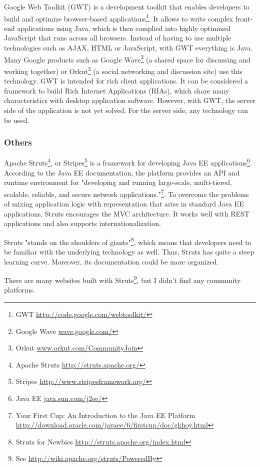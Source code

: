 Google Web Toolkit (GWT) is a development toolkit that enables developers to build and optimize browser-based applications\footnote{GWT \url{http://code.google.com/webtoolkit/}}.  It allows to write complex front-end applications using Java, which is then complied into highly optimized JavaScript that runs across all browsers. Instead of having to use multiple technologies such as AJAX, HTML or JavaScript, with GWT everything is Java. Many Google products such as Google Wave\footnote{Google Wave \url{wave.google.com/}} (a shared space for discussing and working together) or Orkut\footnote{Orkut \url{www.orkut.com/CommunityJoin}} (a social networking and discussion site) use this technology. GWT is intended for rich client applications. It can be considered a framework to build Rich Internet Applications (RIAs), which share many characteristics with desktop application software. 
However, with GWT, the server side of the application is not yet solved. For the server side, any technology can be used. 

\subsubsection{Others}
Apache Struts\footnote{Apache Struts \url{http://struts.apache.org/}}, or Stripes\footnote{Stripes \url{http://www.stripesframework.org/}} is a framework for developing Java EE applications\footnote{Java EE \url{java.sun.com/j2ee/}}.
According to the Java EE documentation, the platform provides an API and runtime environment for "developing and running large-scale, multi-tiered, scalable, reliable, and secure network applications."\footnote{Your First Cup: An Introduction to the Java EE Platform \url{http://download.oracle.com/javaee/6/firstcup/doc/gkhoy.html}}.
To overcome the problems of mixing application logic with representation that arise in standard Java EE applications, Struts encourages the MVC architecture. It works well with REST applications and also supports internationalization. 

Struts "stands on the shoulders of giants"\footnote{Struts for Newbies \url{http://struts.apache.org/index.html}}, which means that developers need to be familiar with the underlying technology as well. Thus, Struts has quite a steep learning curve. Moreover, its documentation could be more organized.

There are many websites built with Struts\footnote{See \url{http://wiki.apache.org/struts/PoweredBy}}, but I didn't find any community platforms. 

